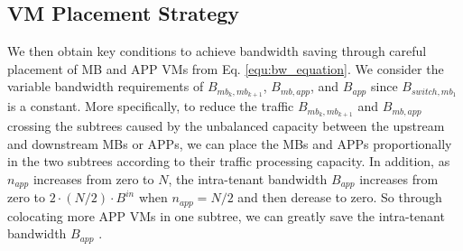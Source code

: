 \documentclass[review]{elsarticle}
\begin{document}
\subsection{VM Placement Strategy}



We then obtain key conditions to achieve bandwidth saving through careful placement of MB and APP VMs from Eq. \ref{equ:bw_equation}. We consider the variable bandwidth requirements of $B_{mb_k,mb_{k+1}}$, $B_{mb,app}$, and $B_{app}$ since $B_{switch,mb_1}$ is a constant. 
More specifically, to reduce the traffic $B_{mb_k,mb_{k+1}}$ and $B_{mb,app}$ crossing the subtrees caused by the unbalanced capacity between the upstream and downstream MBs or APPs, we can place the MBs and APPs proportionally in the two subtrees according to their traffic processing capacity. In addition, as $n_{app}$ increases from zero to $N$, the intra-tenant bandwidth $B_{app}$ increases from zero to $2\cdot (N/2)\cdot B^{in}$ when $n_{app} = N/2$ and then derease to zero. So through colocating more APP VMs in one subtree, we can greatly save the intra-tenant bandwidth $B_{app}$ . 
\end{document}
